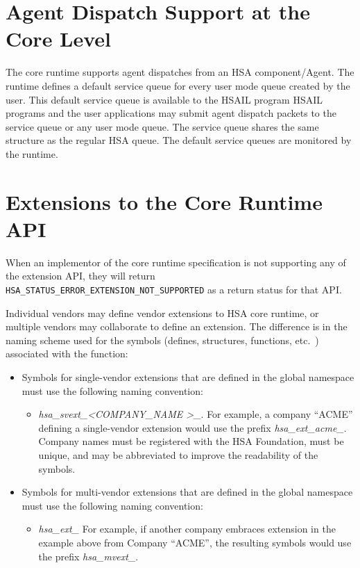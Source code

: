 \documentclass{book}
\begin{document}
\hypertarget{coreapi_agent}{}\section{Agent Dispatch Support at the
Core Level}\label{coreapi_agent} The core runtime supports agent
dispatches from an HSA component/Agent. The runtime defines a
default service queue for every user mode queue created by the user.
This default service queue is available to the HSAIL program HSAIL
programs and the user applications may submit agent dispatch packets
to the service queue or any user mode queue.  The service queue
shares the same structure as the regular HSA queue.  The default
service queues are monitored by the runtime.




\hypertarget{extensions}{}\section{Extensions to the
Core Runtime API}\label{extensions}

When an implementor of the core runtime specification is not
supporting any of the extension API, they will return
\texttt{HSA\_STATUS\_ERROR\_EXTENSION\_NOT\_SUPPORTED} as a return
status for that API.

Individual vendors may define vendor extensions to HSA core runtime,
or multiple vendors may collaborate to define an extension. The
difference is in the naming scheme used for the symbols (defines,
structures, functions, etc.\ ) associated with the function:

\begin{itemize}
\item Symbols for single-vendor extensions that are defined in the
global namespace must use the following naming convention:
  \begin{itemize}
    \item \emph{hsa\_svext\_\textless COMPANY\_NAME \textgreater\_}.
    For example, a company ``ACME'' defining a single-vendor extension
    would use the prefix \emph{hsa\_ext\_acme\_}. Company names must
    be registered with the HSA Foundation, must be unique, and may be
    abbreviated to improve the readability of the symbols.
  \end{itemize}
\item Symbols for multi-vendor extensions that are defined in the
global namespace must use the following naming convention:
  \begin{itemize}
    \item \emph{hsa\_ext\_} For example, if another company
    embraces extension in the example above from Company ``ACME'', the
    resulting symbols would use the prefix \emph{hsa\_mvext\_}.
  \end{itemize}
\end{itemize}
\end{document}
